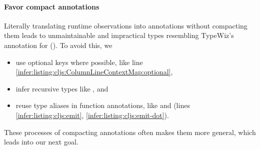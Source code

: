 \begin{figure}
\end{figure}



\paragraph{Favor compact annotations}
Literally translating runtime observations into
annotations without compacting them
leads to unmaintainable and impractical types resembling
TypeWiz's annotation for  ().
To avoid this, we
\begin{itemize}
  \item use optional keys where possible, like line \ref{infer:listing:cljs:ColumnLineContextMap:optional},
  \item infer recursive types like , and
  \item reuse type aliases in function annotations, like
     and  (lines \ref{infer:listing:cljs:emit}, \ref{infer:listing:cljs:emit-dot}).
\end{itemize}
These processes of compacting annotations often makes them more general,
which leads into our next goal.

